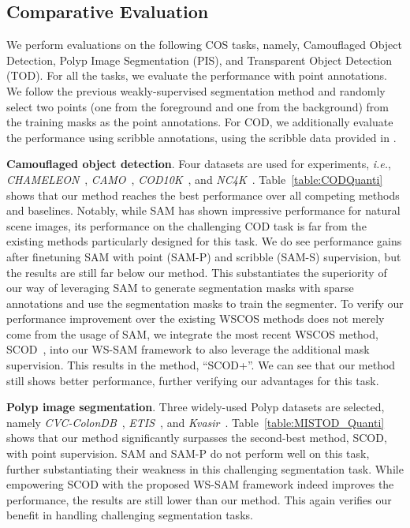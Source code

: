 \subsection{Comparative Evaluation}
We perform evaluations on the following COS tasks, namely,  Camouflaged Object Detection, Polyp Image Segmentation (PIS), and Transparent Object Detection (TOD). For all the tasks, we evaluate the performance with point annotations. We follow the previous weakly-supervised segmentation method \cite{gao2022weakly} and randomly select two points (one from the foreground and one from the background) from the training masks as the point annotations. For COD, we additionally evaluate the performance using scribble annotations, using the scribble data provided in \cite{gao2022weakly}.       

\noindent\textbf{Camouflaged object detection}.
Four datasets are used for experiments, \textit{i.e.}, \textit{CHAMELEON}~\cite{skurowski2018animal}, \textit{CAMO}~\cite{le2019anabranch}, \textit{COD10K}~\cite{fan2021concealed}, and \textit{NC4K}~\cite{lv2021simultaneously}. Table~\ref{table:CODQuanti} shows that our method reaches the best performance over all competing methods and baselines. Notably, while SAM has shown impressive performance for natural scene images, its performance on the challenging COD task is far from the existing methods particularly designed for this task. We do see performance gains after finetuning SAM with point (SAM-P) and scribble (SAM-S) supervision, but the results are still far below our method. This substantiates the superiority of our way of leveraging SAM to generate segmentation masks with sparse annotations and use the segmentation masks to train the segmenter. To verify our performance improvement over the existing WSCOS methods does not merely come from the usage of SAM, we integrate the most recent WSCOS method, SCOD~\cite{he2022weakly}, into our WS-SAM framework to also leverage the additional mask supervision. This results in the method, ``SCOD+''. We can see that our method still shows better performance, further verifying our advantages for this task. 

\noindent\textbf{Polyp image segmentation}.
Three widely-used Polyp datasets are selected, namely \textit{CVC-ColonDB}~\cite{tajbakhsh2015automated}, \textit{ETIS}~\cite{silva2014toward}, and \textit{Kvasir}~\cite{jha2020kvasir}. Table~\ref{table:MISTOD_Quanti} shows that our method significantly  surpasses the second-best method, SCOD, with point supervision. SAM and SAM-P do not perform well on this task, further substantiating their weakness in this challenging segmentation task. 
While empowering SCOD with the proposed WS-SAM framework indeed improves the performance, the results are still lower than our method. This again verifies our benefit in handling challenging segmentation tasks.  

